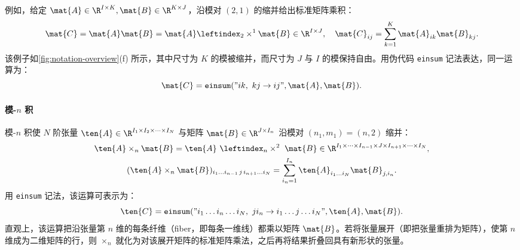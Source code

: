 例如，给定 $\mat{A} \in \R^{I \times K}, \mat{B} \in \R^{K \times J}$，沿模对 $(2,1)$ 的缩并给出标准矩阵乘积：
\begin{equation}
  \mat{C} = \mat{A} \mat{B} = \mat{A} \leftindex_{2} \times^{1} \mat{B} \in \R^{I \times J}, \quad \mat{C}_{ij} = \sum_{k=1}^{K} \mat{A}_{ik} \mat{B}_{kj}.
\end{equation}
该例子如\cref{fig:notation-overview}(f) 所示，其中尺寸为 $K$ 的模被缩并，而尺寸为 $J$ 与 $I$ 的模保持自由。用伪代码 \texttt{einsum} 记法表达，同一运算为：
\begin{equation}
  \mat{C} = \texttt{einsum}({"} ik, \ kj \to ij {"}, \mat{A}, \mat{B}).
\end{equation}

\paragraph{模-$n$ 积} 模-$n$ 积使 $N$ 阶张量 $\ten{A}\in\R^{I_1\times I_2 \times \cdots\times I_N}$ 与矩阵 $\mat{B}\in\R^{J\times I_n}$ 沿模对 $(n_1,m_1)=(n,2)$ 缩并：
\begin{equation}
\begin{gathered}
    \ten{A}\times_n\mat{B} = \ten{A} \ \leftindex_{n} \times^{2} \ \mat{B} \in\R^{I_1\times\cdots\times I_{n-1}\times J\times I_{n+1}\times\cdots\times I_N}, \\
    (\ten{A}\times_n\mat{B})_{i_1\dots i_{n-1}\,j\,i_{n+1}\dots i_N}=\sum_{i_n=1}^{I_n}\ten{A}_{i_1\dots i_N} \mat{B}_{j,i_n}.
\end{gathered}
\end{equation}
用 \texttt{einsum} 记法，该运算可表示为：
\begin{equation}
    \ten{C} = \texttt{einsum}({"} i_1\dots i_n \dots i_N, \ j i_n \to i_1 \dots j \dots i_N {"}, \ten{A}, \mat{B}).
\end{equation}
直观上，该运算把沿张量第 $n$ 维的每条纤维（fiber，即每条一维线）都乘以矩阵 $\mat{B}$。若将张量展开（即把张量重排为矩阵），使第 $n$ 维成为二维矩阵的行，则 $\times_n$ 就化为对该展开矩阵的标准矩阵乘法，之后再将结果折叠回具有新形状的张量。

